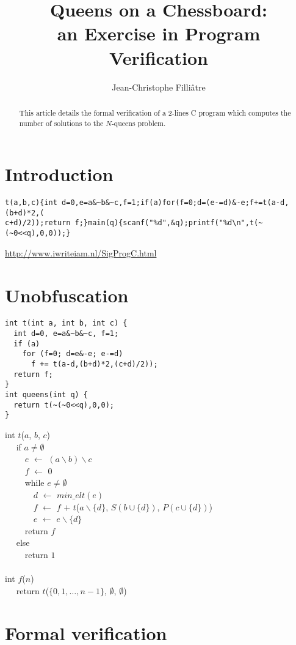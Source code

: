 \documentclass[a4paper]{llncs}
\newcommand{\kw}[1]{\textsf{#1}}
\newcommand{\minelt}[1]{\ensuremath{\mathit{min\_elt}(#1)}}
\begin{document}
\title{Queens on a Chessboard: \\
       an Exercise in Program Verification}
\author{Jean-Christophe Filli\^atre}
\maketitle

\begin{abstract}
  This article details the formal verification of a 2-lines C program
  which computes the number of solutions to the $N$-queens problem.
\end{abstract}

\section{Introduction}

\begin{verbatim}
t(a,b,c){int d=0,e=a&~b&~c,f=1;if(a)for(f=0;d=(e-=d)&-e;f+=t(a-d,(b+d)*2,(
c+d)/2));return f;}main(q){scanf("%d",&q);printf("%d\n",t(~(~0<<q),0,0));}
\end{verbatim}

\url{http://www.iwriteiam.nl/SigProgC.html}

\section{Unobfuscation}

\begin{verbatim}
int t(int a, int b, int c) {
  int d=0, e=a&~b&~c, f=1;
  if (a)
    for (f=0; d=e&-e; e-=d)
      f += t(a-d,(b+d)*2,(c+d)/2));
  return f;
}
int queens(int q) {
  return t(~(~0<<q),0,0);
}
\end{verbatim}

{\begin{obeylines}
  \kw{int} $t$($a$, $b$, $c$) 
  ~~ \kw{if} $a \not= \emptyset$ 
  ~~~~ $e$ $\leftarrow$ $(a \backslash  b) \backslash c$ 
  ~~~~ $f$ $\leftarrow$ 0 
  ~~~~ \kw{while} $e \not=\emptyset$ 
  ~~~~~~ $d$ $\leftarrow$ $\minelt{e}$ 
  ~~~~~~ $f$ $\leftarrow$ $f$ $+$ $t$($a\backslash \{d\}$, $S(b\cup\{d\})$, $P(c\cup\{d\})$) 
  ~~~~~~ $e$ $\leftarrow$ $e \backslash  \{d\}$ 
  ~~~~ \kw{return} $f$ 
  ~~ \kw{else} 
  ~~~~ \kw{return} $1$ 
  ~~ 
  \kw{int} $f$($n$) 
  ~~ \kw{return} $t$($\{0,1,\dots,n-1\}$, $\emptyset$, $\emptyset$)
\end{obeylines}}


\section{Formal verification}
\end{document}
